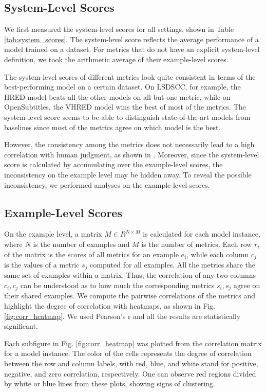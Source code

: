 \documentclass[runningheads]{llncs}
\begin{document}
    \subsection{System-Level Scores}
    We first measured the system-level scores for all settings, shown in Table \ref{tab:system_scores}. The system-level score reflects the average performance of a model trained on a dataset. For metrics that do not have an explicit system-level definition, we took the arithmetic average of their example-level scores.
    

    The system-level scores of different metrics look quite consistent in terms of the best-performing model on a certain dataset. On LSDSCC, for example, the HRED model beats all the other models on all but one metric, while on OpenSubtitles, the VHRED model wins the best of most of the metrics. The system-level score seems to be able to distinguish state-of-the-art models from baselines since most of the metrics agree on which model is the best.

    However, the consistency among the metrics does not necessarily lead to a high correlation with human judgment, as shown in \cite{HowNot}. Moreover, since the system-level score is calculated by accumulating over the example-level scores, the inconsistency on the example level may be hidden away. To reveal the possible inconsistency, we performed analyses on the example-level scores.

    \subsection{Example-Level Scores}
    On the example level, a matrix $M \in R^{N \times M}$ is calculated for each model instance, where $N$ is the number of examples and $M$ is the number of metrics. Each row $r_i$ of the matrix is the scores of all metrics for an example $e_i$, while each column $c_j$ is the values of a metric $s_j$ computed for all examples. All the metrics share the same set of examples within a matrix. Thus, the correlation of any two columns $c_i, c_j$ can be understood as to how much the corresponding metrics $s_i, s_j$ agree on their shared examples. We compute the pairwise correlations of the metrics and highlight the degree of correlation with heatmaps, as shown in Fig. \ref{fig:corr_heatmap}. We used Pearson's r and all the results are statistically significant.

    

    Each subfigure in Fig. \ref{fig:corr_heatmap} was plotted from the correlation matrix for a model instance. The color of the cells represents the degree of correlation between the row and column labels, with red, blue, and white stand for positive, negative, and zero correlation, respectively. One can observe red regions divided by white or blue lines from these plots, showing signs of clustering.
\end{document}

